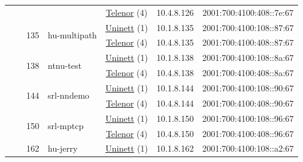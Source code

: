 \begin{small}
\begin{center}
\begin{longtable}{|c|c|c|c|c|c|c|c|}
  &  &  &  & \multicolumn{2}{|c|}{\tiny{\href{https://www.telenor.no}{Telenor} (4)}} & \tiny{10.4.8.126} & \tiny{2001:700:4100:408::7e:67} \\* \cline{3-3}\cline{4-4}\cline{5-5}\cline{6-6}\cline{7-7}\cline{8-8}
  &  & \multirow{2}{*}{\tiny{135}} & \multicolumn{1}{|l|}{\multirow{2}{*}{\tiny{hu-multipath}}} & \multicolumn{2}{|c|}{\tiny{\href{https://www.uninett.no}{Uninett} (1)}} & \tiny{10.1.8.135} & \tiny{2001:700:4100:108::87:67} \\* \cline{5-5}\cline{6-6}\cline{7-7}\cline{8-8}
  &  &  &  & \multicolumn{2}{|c|}{\tiny{\href{https://www.telenor.no}{Telenor} (4)}} & \tiny{10.4.8.135} & \tiny{2001:700:4100:408::87:67} \\* \cline{3-3}\cline{4-4}\cline{5-5}\cline{6-6}\cline{7-7}\cline{8-8}
  &  & \multirow{2}{*}{\tiny{138}} & \multicolumn{1}{|l|}{\multirow{2}{*}{\tiny{ntnu-test}}} & \multicolumn{2}{|c|}{\tiny{\href{https://www.uninett.no}{Uninett} (1)}} & \tiny{10.1.8.138} & \tiny{2001:700:4100:108::8a:67} \\* \cline{5-5}\cline{6-6}\cline{7-7}\cline{8-8}
  &  &  &  & \multicolumn{2}{|c|}{\tiny{\href{https://www.telenor.no}{Telenor} (4)}} & \tiny{10.4.8.138} & \tiny{2001:700:4100:408::8a:67} \\* \cline{3-3}\cline{4-4}\cline{5-5}\cline{6-6}\cline{7-7}\cline{8-8}
  &  & \multirow{2}{*}{\tiny{144}} & \multicolumn{1}{|l|}{\multirow{2}{*}{\tiny{srl-nndemo}}} & \multicolumn{2}{|c|}{\tiny{\href{https://www.uninett.no}{Uninett} (1)}} & \tiny{10.1.8.144} & \tiny{2001:700:4100:108::90:67} \\* \cline{5-5}\cline{6-6}\cline{7-7}\cline{8-8}
  &  &  &  & \multicolumn{2}{|c|}{\tiny{\href{https://www.telenor.no}{Telenor} (4)}} & \tiny{10.4.8.144} & \tiny{2001:700:4100:408::90:67} \\* \cline{3-3}\cline{4-4}\cline{5-5}\cline{6-6}\cline{7-7}\cline{8-8}
  &  & \multirow{2}{*}{\tiny{150}} & \multicolumn{1}{|l|}{\multirow{2}{*}{\tiny{srl-mptcp}}} & \multicolumn{2}{|c|}{\tiny{\href{https://www.uninett.no}{Uninett} (1)}} & \tiny{10.1.8.150} & \tiny{2001:700:4100:108::96:67} \\* \cline{5-5}\cline{6-6}\cline{7-7}\cline{8-8}
  &  &  &  & \multicolumn{2}{|c|}{\tiny{\href{https://www.telenor.no}{Telenor} (4)}} & \tiny{10.4.8.150} & \tiny{2001:700:4100:408::96:67} \\* \cline{3-3}\cline{4-4}\cline{5-5}\cline{6-6}\cline{7-7}\cline{8-8}
  &  & \multirow{2}{*}{\tiny{162}} & \multicolumn{1}{|l|}{\multirow{2}{*}{\tiny{hu-jerry}}} & \multicolumn{2}{|c|}{\tiny{\href{https://www.uninett.no}{Uninett} (1)}} & \tiny{10.1.8.162} & \tiny{2001:700:4100:108::a2:67} \\* \cline{5-5}\cline{6-6}\cline{7-7}\cline{8-8}

\end{longtable}
\end{center}
\end{small}
